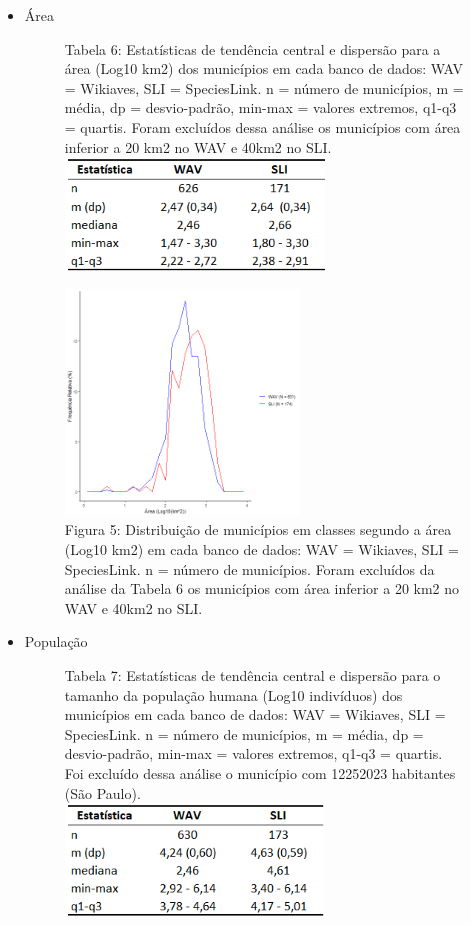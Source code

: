 \begin{itemize}
\item Área

\begin{figure}[h!]
\centering
{\scriptsize Tabela 6: Estatísticas de tendência central e dispersão para a área (Log10 km2) dos municípios em cada banco de dados: WAV = Wikiaves, SLI = SpeciesLink. n = número de municípios, m = média, dp = desvio-padrão, min-max = valores extremos, q1-q3 = quartis. Foram excluídos dessa análise os municípios com área inferior a 20 km2 no WAV e 40km2 no SLI.}
\\
\includegraphics[height = 3cm]{Tabelas/6.png}
\end{figure}

\newpage

\begin{figure}[h!]
\centering
\includegraphics[height = 6cm]{Imagens/223.png}
\\{\scriptsize Figura 5: Distribuição de municípios em classes segundo a área (Log10 km2) em cada banco de dados: WAV = Wikiaves, SLI = SpeciesLink. n = número de municípios. Foram excluídos da análise da Tabela 6 os municípios com área inferior a 20 km2 no WAV e 40km2 no SLI.}
\end{figure}


\item População

\begin{figure}[h!]
\centering
{\scriptsize Tabela 7: Estatísticas de tendência central e dispersão para o tamanho da população humana (Log10 indivíduos) dos municípios em cada banco de dados: WAV = Wikiaves, SLI = SpeciesLink. n = número de municípios, m = média, dp = desvio-padrão, min-max = valores extremos, q1-q3 = quartis. Foi excluído dessa análise o município com 12252023 habitantes (São Paulo).}
\\
\includegraphics[height = 3cm]{Tabelas/7.png}
\end{figure}




\end{itemize}
